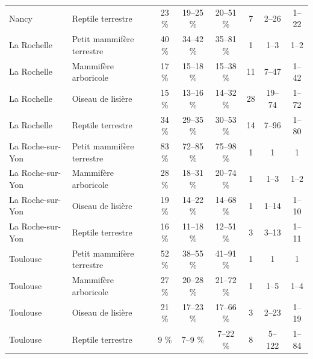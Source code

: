 \documentclass[a4paper,11pt]{report}
\begin{document}
\begin{landscape}
\begin{table}[H]
\begin{tabular}{llcccccc}
Nancy & Reptile terrestre & 23 \% & 19--25 \% & 20--51 \% & 7 & 2--26 & 1--22 \\
La Rochelle & Petit mammifère terrestre & 40 \% & 34--42 \% & 35--81 \% & 1 & 1--3 & 1--2 \\
La Rochelle & Mammifère arboricole & 17 \% & 15--18 \% & 15--38 \% & 11 & 7--47 & 1--42 \\
La Rochelle & Oiseau de lisière & 15 \% & 13--16 \% & 14--32 \% & 28 & 19--74 & 1--72 \\
La Rochelle & Reptile terrestre & 34 \% & 29--35 \% & 30--53 \% & 14 & 7--96 & 1--80 \\
La Roche-sur-Yon & Petit mammifère terrestre & 83 \% & 72--85 \% & 75--98 \% & 1 & 1 & 1 \\
La Roche-sur-Yon & Mammifère arboricole & 28 \% & 18--31 \% & 20--74 \% & 1 & 1--3 & 1--2 \\
La Roche-sur-Yon & Oiseau de lisière & 19 \% & 14--22 \% & 14--68 \% & 1 & 1--14 & 1--10 \\
La Roche-sur-Yon & Reptile terrestre & 16 \% & 11--18 \% & 12--51 \% & 3 & 3--13 & 1--11 \\
Toulouse & Petit mammifère terrestre & 52 \% & 38--55 \% & 41--91 \% & 1 & 1 & 1 \\
Toulouse & Mammifère arboricole & 27 \% & 20--28 \% & 21--72 \% & 1 & 1--5 & 1--4 \\
Toulouse & Oiseau de lisière & 21 \% & 17--23 \% & 17--66 \% & 3 & 2--23 & 1--19 \\
Toulouse & Reptile terrestre & 9 \% & 7--9 \% & 7--22 \% & 8 & 5--122 & 1--84 \\
\bottomrule
\end{tabular}
\end{table}
\end{landscape}
\end{document}
